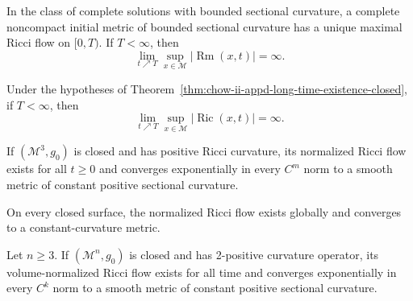 \begin{theorem}
\label{thm:chow-ii-appd-long-time-existence-complete}
In the class of complete solutions with bounded sectional curvature, a
complete noncompact initial metric of bounded sectional curvature has a unique
maximal Ricci flow on $[0,T)$. If $T<\infty$, then
\[
 \lim_{t\nearrow T}\sup_{x\in\mathcal M}|\operatorname{Rm}(x,t)|=\infty.
\]
\end{theorem}

\begin{theorem}
\label{thm:chow-ii-appd-long-time-existence-ricci-blowup}
Under the hypotheses of Theorem~\ref{thm:chow-ii-appd-long-time-existence-closed},
if $T<\infty$, then
\[
 \lim_{t\nearrow T}\sup_{x\in\mathcal M}|\operatorname{Ric}(x,t)|=\infty.
\]
\end{theorem}

\begin{theorem}
\label{thm:chow-ii-appd-hamilton-positive-ricci-three-manifolds}
If $(\mathcal M^3,g_0)$ is closed and has positive Ricci curvature, its
normalized Ricci flow exists for all $t\geq0$ and converges exponentially in
every $C^m$ norm to a smooth metric of constant positive sectional curvature.
\end{theorem}

\begin{remark}
\label{rem:chow-ii-appd-closed-surfaces}
On every closed surface, the normalized Ricci flow exists globally and
converges to a constant-curvature metric.
\end{remark}

\begin{theorem}
\label{thm:chow-ii-appd-two-positive-curvature-convergence}
Let $n\geq3$. If $(\mathcal M^n,g_0)$ is closed and has 2-positive curvature
operator, its volume-normalized Ricci flow exists for all time and converges
exponentially in every $C^k$ norm to a smooth metric of constant positive
sectional curvature.
\end{theorem}

